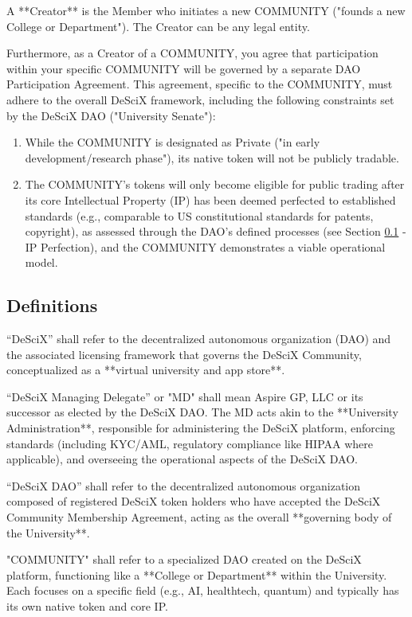 \documentclass{article}
\begin{document}
A **Creator** is the Member who initiates a new COMMUNITY ("founds a new College or Department"). The Creator can be any legal entity.

Furthermore, as a Creator of a COMMUNITY, you agree that participation within your specific COMMUNITY will be governed by a separate DAO Participation Agreement. This agreement, specific to the COMMUNITY, must adhere to the overall DeSciX framework, including the following constraints set by the DeSciX DAO ("University Senate"):

\begin{enumerate}
    \item While the COMMUNITY is designated as Private ("in early development/research phase"), its native token will not be publicly tradable.
    \item The COMMUNITY's tokens will only become eligible for public trading after its core Intellectual Property (IP) has been deemed perfected to established standards (e.g., comparable to US constitutional standards for patents, copyright), as assessed through the DAO's defined processes (see Section \ref{sec:definitions} - IP Perfection), and the COMMUNITY demonstrates a viable operational model.
\end{enumerate}


\subsection{Definitions} \label{sec:definitions}

“DeSciX” shall refer to the decentralized autonomous organization (DAO) and the associated licensing framework that governs the DeSciX Community, conceptualized as a **virtual university and app store**.

“DeSciX Managing Delegate” or "MD" shall mean Aspire GP, LLC or its successor as elected by the DeSciX DAO. The MD acts akin to the **University Administration**, responsible for administering the DeSciX platform, enforcing standards (including KYC/AML, regulatory compliance like HIPAA where applicable), and overseeing the operational aspects of the DeSciX DAO.

“DeSciX DAO” shall refer to the decentralized autonomous organization composed of registered DeSciX token holders who have accepted the DeSciX Community Membership Agreement, acting as the overall **governing body of the University**.

"COMMUNITY" shall refer to a specialized DAO created on the DeSciX platform, functioning like a **College or Department** within the University. Each focuses on a specific field (e.g., AI, healthtech, quantum) and typically has its own native token and core IP.
\end{document}
